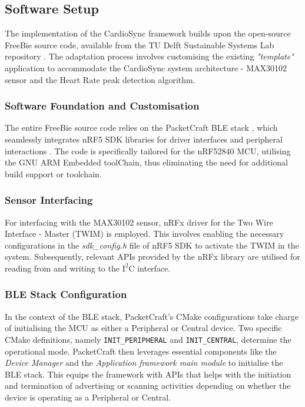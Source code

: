 \subsection{Software Setup}
\label{sec:software_setup_impl}
The implementation of the CardioSync framework builds upon the open-source FreeBie source code, available from the TU Delft Sustainable Systems Lab repository \cite{FreeBieGithub}. The adaptation process involves customising the existing \textit{"template"} application to accommodate the CardioSync system architecture  - MAX30102 sensor and the Heart Rate peak detection algorithm.

\subsubsection{Software Foundation and Customisation}

The entire FreeBie source code relies on the PacketCraft BLE stack \cite{2020Packetcraft}, which seamlessly integrates nRF5 SDK libraries for driver interfaces and peripheral interactions \cite{2023nRF5}. The code is specifically tailored for the nRF52840 MCU, utilising the GNU ARM Embedded toolChain, thus eliminating the need for additional build support or toolchain.

\subsubsection{Sensor Interfacing}

For interfacing with the MAX30102 sensor, nRFx driver for the Two Wire Interface - Master (TWIM) is employed. This involves enabling the necessary configurations in the \textit{sdk\_config.h} file of nRF5 SDK to activate the TWIM in the system. Subsequently, relevant APIs provided by the nRFx library are utilised for reading from and writing to the \(\text{I}^2\text{C}\) interface.
 
\subsubsection{BLE Stack Configuration}

In the context of the BLE stack, PacketCraft's CMake configurations take charge of initialising the MCU as either a Peripheral or Central device. Two specific CMake definitions, namely \texttt{INIT\_PERIPHERAL} and \texttt{INIT\_CENTRAL}, determine the operational mode. PacketCraft then leverages essential components like the \textit{Device Manager} and the \textit{Application framework main module} to initialise the BLE stack. This equips the framework with APIs that helps with the initiation and termination of advertising or scanning activities depending on whether the device is operating as a Peripheral or Central.

